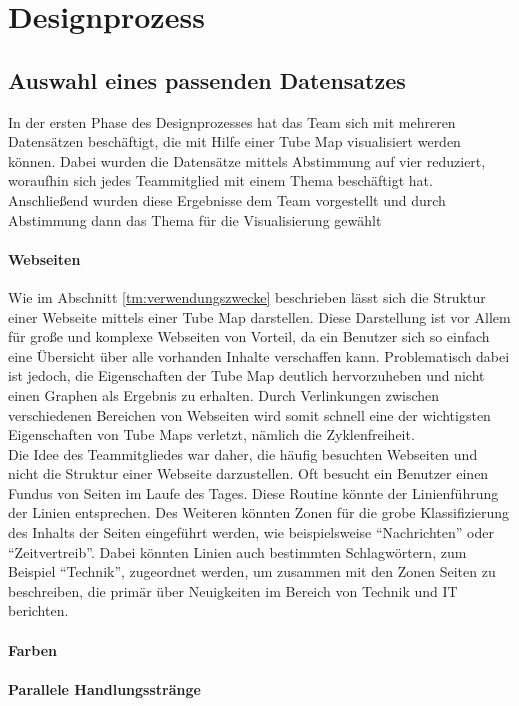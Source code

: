 \documentclass[color,german]{tudbook}
\begin{document}
\chapter{Designprozess}
\section{Auswahl eines passenden Datensatzes}
In der ersten Phase des Designprozesses hat das Team sich mit mehreren Datensätzen beschäftigt, die mit Hilfe einer Tube Map visualisiert werden können. Dabei wurden die Datensätze mittels Abstimmung auf vier reduziert, woraufhin sich jedes Teammitglied mit einem Thema beschäftigt hat. Anschließend wurden diese Ergebnisse dem Team vorgestellt und durch Abstimmung dann das Thema für die Visualisierung gewählt
\subsubsection{Webseiten}
Wie im Abschnitt \ref{tm:verwendungszwecke} beschrieben lässt sich die Struktur einer Webseite mittels einer Tube Map darstellen.  Diese Darstellung ist vor Allem für große und komplexe Webseiten von Vorteil, da ein Benutzer sich so einfach eine Übersicht über alle vorhanden Inhalte verschaffen kann. Problematisch dabei ist jedoch, die Eigenschaften der Tube Map deutlich hervorzuheben und nicht einen Graphen als Ergebnis zu erhalten. Durch Verlinkungen zwischen verschiedenen Bereichen von Webseiten wird somit schnell eine der wichtigsten Eigenschaften von Tube Maps verletzt, nämlich die Zyklenfreiheit. \\
Die Idee des Teammitgliedes war daher, die häufig besuchten Webseiten und nicht die Struktur einer Webseite darzustellen. Oft besucht ein Benutzer einen Fundus von Seiten im Laufe des Tages. Diese Routine könnte der Linienführung der Linien entsprechen. Des Weiteren könnten Zonen für die grobe Klassifizierung des Inhalts der Seiten eingeführt werden, wie beispielsweise "`Nachrichten"' oder "`Zeitvertreib"'. Dabei könnten Linien auch bestimmten Schlagwörtern, zum Beispiel "`Technik"', zugeordnet werden, um zusammen mit den Zonen Seiten zu beschreiben, die primär über Neuigkeiten im Bereich von Technik und IT berichten. 

\subsubsection{Farben}
\subsubsection{Parallele Handlungsstränge}
\end{document}
